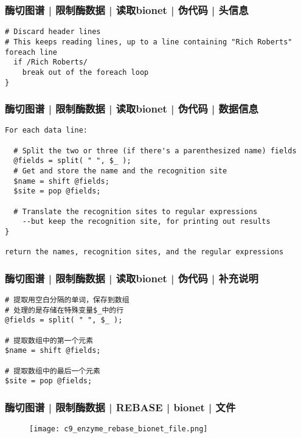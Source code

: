 \begin{frame}[fragile]
  \frametitle{酶切图谱 | 限制酶数据 | 读取bionet | 伪代码 | 头信息}
  \vspace{-1.5em}
\begin{lstlisting}
# Discard header lines
# This keeps reading lines, up to a line containing "Rich Roberts"
foreach line 
  if /Rich Roberts/ 
    break out of the foreach loop
}
\end{lstlisting}
\end{frame}


\begin{frame}[fragile]
  \frametitle{酶切图谱 | 限制酶数据 | 读取bionet | 伪代码 | 数据信息}
  \vspace{-1.5em}
\begin{lstlisting}[basicstyle=\small\tt]
For each data line:

  # Split the two or three (if there's a parenthesized name) fields
  @fields = split( " ", $_ );
  # Get and store the name and the recognition site
  $name = shift @fields;
  $site = pop @fields;

  # Translate the recognition sites to regular expressions
    --but keep the recognition site, for printing out results
}

return the names, recognition sites, and the regular expressions
\end{lstlisting}
\end{frame}

\begin{frame}[fragile]
  \frametitle{酶切图谱 | 限制酶数据 | 读取bionet | 伪代码 | \alert{补充说明}}
  \vspace{-1.5em}
\begin{lstlisting}
# 提取用空白分隔的单词，保存到数组
# 处理的是存储在特殊变量$_中的行
@fields = split( " ", $_ );

# 提取数组中的第一个元素
$name = shift @fields;

# 提取数组中的最后一个元素
$site = pop @fields;
\end{lstlisting}
\end{frame}

\begin{frame}
  \frametitle{酶切图谱 | 限制酶数据 | REBASE | bionet | 文件}
  \begin{figure}
    \centering
    \texttt{[image: c9\_enzyme\_rebase\_bionet\_file.png]}
  \end{figure}
\end{frame}

